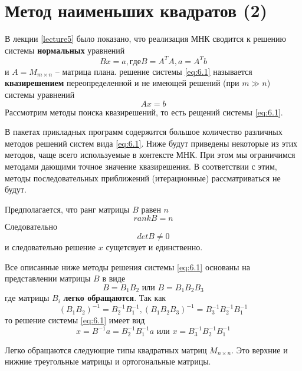 \section{Метод наименьших квадратов (2)}


В лекции \ref{lecture5} было показано, что реализация МНК сводится к решению системы \textbf{нормальных} уравнений 
\begin{equation} \label{eq:6.1}
	Bx = a, где B = A^TA, a = A^Tb
\end{equation}
и $A=M_{m \times n}$  -- матрица плана. решение системы \ref{eq:6.1} называется \textbf{квазирешением} переопределенной и не имеющей решений (при $m\gg n$) системы уравнений 
\begin{equation}
	Ax = b
\end{equation}
Рассмотрим методы поиска квазирешений, то есть рещений системы \ref{eq:6.1}. 


В пакетах прикладных программ содержится большое количество различных методов решений систем вида \ref{eq:6.1}. Ниже будут приведены некоторые из этих методов, чаще всего используемые в контексте МНК. При этом мы ограничимся методами дающими точное значение квазирешения. В соответствии с этим, методы последовательных приближений (итерационные) рассматриваться не будут.

Предполагается, что ранг матрицы $B$ равен $n$
\begin{equation}
	rank B = n
\end{equation}
Следовательно
\begin{equation}
	det B \neq 0
\end{equation}
и следовательно решение $x$ сущетсвует и единственно.

Все описанные ниже методы решения системы \ref{eq:6.1} основаны на представлении матрицы $B$ в виде
\begin{equation}
	B = B_1 B_2 \text{ или } B = B_1 B_2 B_3
\end{equation}
где матрицы $B_i$ \textbf{легко обращаются}.
Так как
\begin{equation}
	(B_1B_2)^{-1} = B_2^{-1} B_1^{-1}, (B_1B_2B_3)^{-1} = B_3^{-1}B_2^{-1} B_1^{-1}
\end{equation}
то решение системы \ref{eq:6.1} имеет вид
\begin{equation}
	x = B^{-1} a = B_2^{-1} B_1^{-1} a \text{ или } x = B_3^{-1}B_2^{-1} B_1^{-1}
\end{equation}

Легко обращаются следующие типы квадратных матриц $M_{n \times n}$. Это верхние и нижние треугольные матрицы и ортогональные матрицы.

